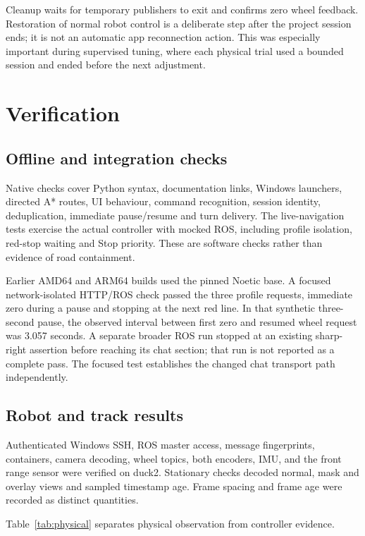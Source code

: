 \documentclass[10pt,a4paper,twocolumn]{article}
\begin{document}
Cleanup waits for temporary publishers to exit and confirms zero wheel
feedback. Restoration of normal robot control is a deliberate step after the
project session ends; it is not an automatic app reconnection action. This was especially
important during supervised tuning, where each physical trial used a bounded
session and ended before the next adjustment.

\section{Verification}

\subsection{Offline and integration checks}

Native checks cover Python syntax, documentation links, Windows launchers,
directed A* routes, UI behaviour, command recognition, session identity,
deduplication, immediate pause/resume and turn delivery. The live-navigation
tests exercise the actual controller with mocked ROS, including profile
isolation, red-stop waiting and Stop priority. These are software checks rather
than evidence of road containment.

Earlier AMD64 and ARM64 builds used the pinned Noetic base. A focused
network-isolated HTTP/ROS check passed the three profile requests, immediate
zero during a pause and stopping at the next red line. In that synthetic
three-second pause, the observed interval between first zero and resumed wheel
request was 3.057 seconds. A separate broader ROS run stopped at an existing
sharp-right assertion before reaching its chat section; that run is not
reported as a complete pass. The focused test establishes the changed chat
transport path independently.

\subsection{Robot and track results}

Authenticated Windows SSH, ROS master access, message fingerprints, containers,
camera decoding, wheel topics, both encoders, IMU, and the front range sensor
were verified on duck2. Stationary checks decoded normal, mask and overlay views and sampled timestamp
age. Frame spacing and frame age were recorded as distinct quantities.

Table~\ref{tab:physical} separates physical observation from controller evidence.
\end{document}
